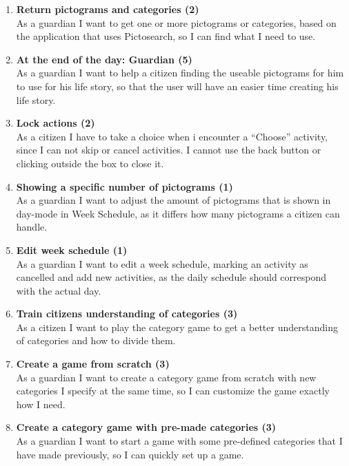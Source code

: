 \begin{enumerate}
	\item \textbf{Return pictograms and categories (2)}\\
	As a guardian I want to get one or more pictograms or categories, based on the application that uses Pictosearch, so I can find what I need to use.
	
	\item \textbf{At the end of the day: Guardian (5)}\\
	As a guardian I want to help a citizen finding the useable pictograms for him to use for his life story, so that the user will have an easier time creating his life story.
	
	\item \textbf{Lock actions (2) }\\
	As a citizen I have to take a choice when i encounter a “Choose” activity, since I can not skip or cancel activities. I cannot use the back button or clicking outside the box to close it.
	
	\item \textbf{Showing a specific number of pictograms (1)}\\
	As a guardian I want to adjust the amount of pictograms that is shown in day-mode in Week Schedule, as it differs how many pictograms a citizen can handle.
	
	\item \textbf{Edit week schedule (1)} \\
	As a guardian I want to edit a week schedule, marking an activity as cancelled and add new activities, as the daily schedule should correspond with the actual day. 
	
	\item \textbf{Train citizens understanding of categories (3)}\\
	As a citizen I want to play the category game to get a better understanding of categories and how to divide them.
	
	\item \textbf{Create a game from scratch (3)}\\
	As a guardian I want to create a category game from scratch with new categories I specify at the same time, so I can customize the game exactly how I need.
	
	\item \textbf{Create a category game with pre-made categories (3)}\\
	As a guardian I want to start a game with some pre-defined categories that I have made previously, so I can quickly set up a game.
	

\end{enumerate}
